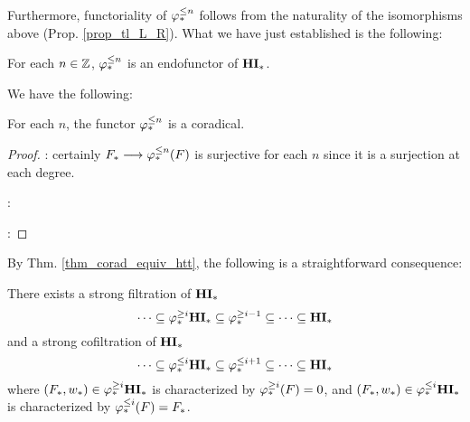 Furthermore, functoriality of $\varphi^{\leq n}_{*}$ follows from the 
naturality of the isomorphisms above (Prop. \ref{prop_tl_L_R}).
What we have just established is the following:

\begin{lem}
For each $n \in \mathbb{Z}$, $\varphi^{\leq n}_{*}$ is an endofunctor of $\mathbf{HI}_*$.
\end{lem}


We have the following:

\begin{prop}
For each $n$, the functor $\varphi^{\leq n}_{*}$ is a coradical.
\end{prop}

\begin{proof}
 : certainly
$F_* \longrightarrow \varphi^{\leq n}_{*}(F)$ is surjective for each $n$ since it is
a surjection at each degree.

 :

 :
\end{proof}

By Thm. \ref{thm_corad_equiv_htt}, the following is a 
straightforward consequence:

\begin{cor}
There exists a strong filtration of $\mathbf{HI}_*$
\[
\cdots \subseteq \varphi^{\geq i}_{*}\mathbf{HI}_* \subseteq \varphi^{\geq i - 1}_{*} \subseteq 
   \cdots \subseteq \mathbf{HI}_*
\]
and a strong cofiltration of $\mathbf{HI}_*$
\[
\cdots \subseteq \varphi^{\leq i}_{*}\mathbf{HI}_* \subseteq \varphi^{\leq i + 1}_{*} \subseteq 
   \cdots \subseteq \mathbf{HI}_*
\]
where $(F_*, w_*) \in \varphi^{\geq i}_{*}\mathbf{HI}_*$ is characterized by
$\varphi^{\geq i}_{*}(F) = 0$, and $(F_*, w_*) \in \varphi^{\leq i}_{*}\mathbf{HI}_*$ is
characterized by $\varphi^{\leq i}_{*}(F) = F_*$.
\end{cor}
